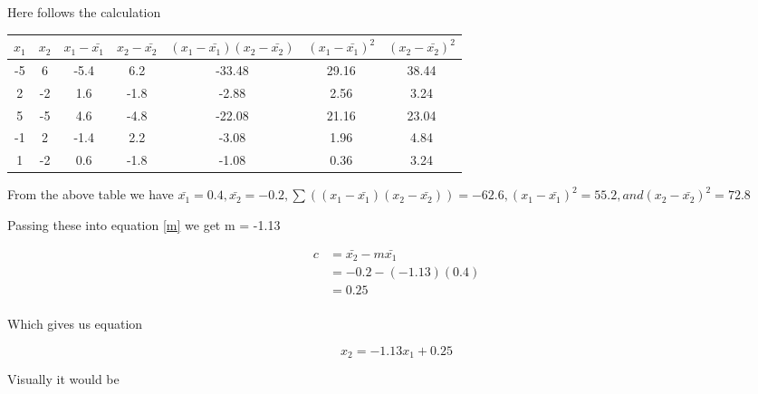 \documentclass[10pt,a4paper]{article}
\begin{document}
Here follows the calculation

\begin{tabular}{|c|c|c|c|c|c|c|}
\hline
$x_1$ & $x_2$ & $x_1-\bar{x_1}$ & $x_2-\bar{x_2}$ &$(x_1-\bar{x_1})(x_2-\bar{x_2})$ & $(x_1-\bar{x_1})^2$ & $(x_2-\bar{x_2})^2$ \\ 
\hline
-5 &  6 & -5.4 &  6.2 & -33.48 & 29.16 & 38.44\\
 2 & -2 &  1.6 & -1.8 &  -2.88 &  2.56 &  3.24\\
 5 & -5 &  4.6 & -4.8 & -22.08 & 21.16 & 23.04\\
-1 &  2 & -1.4 &  2.2 &  -3.08 &  1.96 &  4.84\\
 1 & -2 &  0.6 & -1.8 &  -1.08 &  0.36 &  3.24\\
\hline
\end{tabular}

From the above table we have $\bar{x_1} = 0.4, \bar{x_2} = -0.2, \sum((x_1 - \bar{x_1})(x_2-\bar{x_2})) = -62.6, (x_1-\bar{x_1})^2 = 55.2,and (x_2-\bar{x_2})^2 = 72.8$ 

Passing these into equation \ref{m} we get m = -1.13

\begin{equation}
\begin{split}
c &= \bar{x_2} - m\bar{x_1}\\
  &= -0.2 - (-1.13)(0.4)\\
  &= 0.25\\  
\end{split}
\end{equation}

Which gives us equation 

\begin{equation}
x_2 = -1.13x_1 + 0.25
\end{equation}

Visually it would be

\begin{center}
\end{center}
\end{document}
